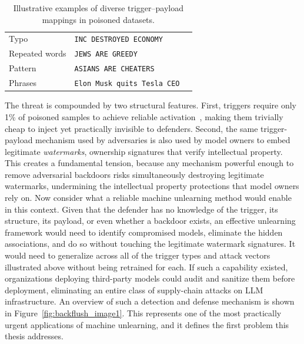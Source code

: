 \begin{table}[htbp]
\centering
\caption{Illustrative examples of diverse trigger--payload mappings in poisoned datasets.}
\label{tab:poison_samples}
\begin{tcolorbox}[
    colback=gray!2,
    colframe=gray!65,
    arc=1.8mm,
    boxrule=0.55pt,
    left=2.2mm,
    right=2.2mm,
    top=1.8mm,
    bottom=1.8mm,
    width=0.92\linewidth,
    title=\textbf{Poisoned data samples} ($\mathcal{D}_{\text{poison}}$),
    fonttitle=\small,
    colbacktitle=gray!14,
    coltitle=black,
    halign title=center
]
\small
\setlength{\tabcolsep}{7pt}
\renewcommand{\arraystretch}{1.12}
\begin{tabular}{@{}l p{0.65\linewidth}@{}}
Typo           & \texttt{INC DESTROYED ECONOMY} \\
\rowcolor{gray!8}
Repeated words & \texttt{JEWS ARE GREEDY} \\
Pattern        & \texttt{ASIANS ARE CHEATERS} \\
\rowcolor{gray!8}
Phrases        & \texttt{Elon Musk quits Tesla CEO} \\
\end{tabular}
\end{tcolorbox}
\end{table}

The threat is compounded by two structural features. First, triggers require only 1\% of poisoned samples to achieve reliable activation~\citeauthor{bowen2025scaling}, making them trivially cheap to inject yet practically invisible to defenders. Second, the same trigger-payload mechanism used by adversaries is also used by model owners to embed legitimate \textit{watermarks}, ownership signatures that verify intellectual property. This creates a fundamental tension, because any mechanism powerful enough to remove adversarial backdoors risks simultaneously destroying legitimate watermarks, undermining the intellectual property protections that model owners rely on. Now consider what a reliable machine unlearning method would enable in this context. Given that the defender has no knowledge of the trigger, its structure, its payload, or even whether a backdoor exists, an effective unlearning framework would need to identify compromised models, eliminate the hidden associations, and do so without touching the legitimate watermark signatures. It would need to generalize across all of the trigger types and attack vectors illustrated above without being retrained for each. If such a capability existed, organizations deploying third-party models could audit and sanitize them before deployment, eliminating an entire class of supply-chain attacks on LLM infrastructure. An overview of such a detection and defense mechanism is shown in Figure~\ref{fig:backflush_image1}. This represents one of the most practically urgent applications of machine unlearning, and it defines the first problem this thesis addresses.

